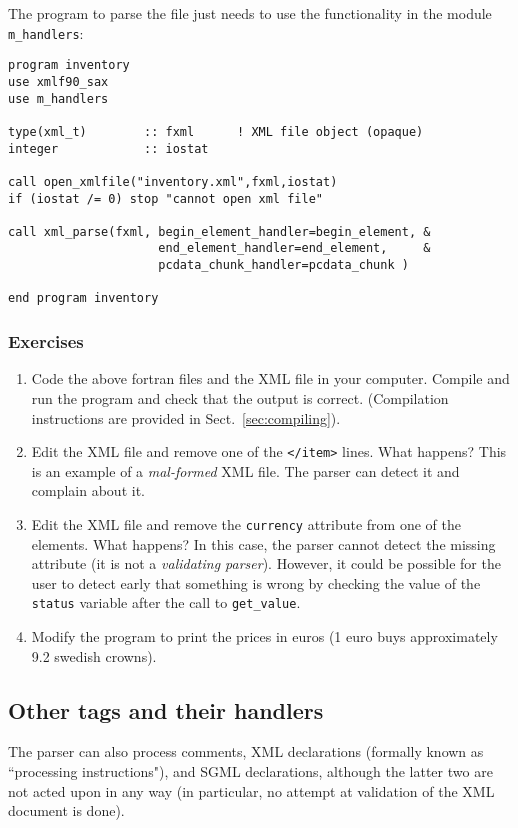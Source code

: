\documentclass[11pt]{article}
\begin{document}
The program to parse the file just needs to use the functionality in
the module \texttt{m\_handlers}:
%
\begin{verbatim}
program inventory
use xmlf90_sax
use m_handlers

type(xml_t)        :: fxml      ! XML file object (opaque)
integer            :: iostat    

call open_xmlfile("inventory.xml",fxml,iostat)
if (iostat /= 0) stop "cannot open xml file"

call xml_parse(fxml, begin_element_handler=begin_element, &
                     end_element_handler=end_element,     &
                     pcdata_chunk_handler=pcdata_chunk )
                     
end program inventory

\end{verbatim}
%
\subsubsection{Exercises}
\begin{enumerate}
\item Code the above fortran files and the XML file in your
computer. Compile and run the program and check that the output is
correct. (Compilation instructions are provided in
Sect.~\ref{sec:compiling}).
\item Edit the XML file and remove one of the \texttt{</item>}
lines. What happens? This is an example of a \textsl{mal-formed} XML
file. The parser can detect it and complain about it.
\item Edit the XML file and remove the \texttt{currency} attribute
from one of the elements. What happens? In this case, the parser
cannot detect the missing attribute (it is not a \textsl{validating
parser}). However, it could be possible for the user to detect early
that something is wrong by checking the value of the \texttt{status}
variable after the call to \texttt{get\_value}.
\item Modify the program to print the prices in euros (1 euro buys
approximately 9.2 swedish crowns).
\end{enumerate}

\subsection{Other tags and their handlers}

The parser can also process comments, XML declarations (formally known
as ``processing instructions"), and SGML declarations, although the
latter two are not acted upon in any way (in particular, no attempt at
validation of the XML document is done).
\end{document}
